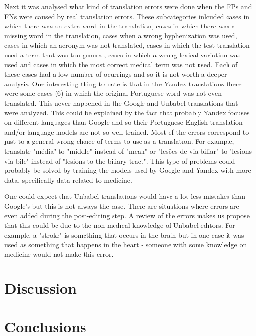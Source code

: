 Next it was analysed what kind of translation errors were done when the FPs and FNs were caused by real translation errors. These subcategories inlcuded cases in which there was an extra word in the translation, cases in which there was a missing word in the translation, cases when a wrong hyphenization was used, cases in which an acronym was not translated,  cases in which the test translation used a term that was too general, cases in which a wrong lexical variation was used  and cases in which the most correct medical term was not used. Each of these cases had a low number of ocurrings and so it is not worth a deeper analysis. One interesting thing to note is that in the Yandex translations there were some cases (6) in which the original Portuguese word was not even translated. This never happened in the Google and Unbabel translations that were analyzed. This could be explained by the fact that probably Yandex focuses on different languages than Google and so their Portuguese-English translation and/or language models are not so well trained. Most of the errors correspond to just to a general wrong  choice of terms to use as a translation. For example, translate "média" to "middle" instead of "mean" or "lesões de via biliar" to "lesions via bile" instead of "lesions to the biliary tract". This type of problems could probably be solved by training the models used by Google and Yandex with more data, specifically data related to medicine.

One could expect that Unbabel translations would have a lot less mistakes than Google's but this is not always the case. There are situations where errors are even added during the post-editing step. A review of the errors makes us propose that this could be due to the non-medical knowledge of Unbabel editors. For example, a "stroke" is something that occurs in the brain but in one case it was used as something that happens in the heart - someone with some knowledge on medicine would not make this error.


\section{Discussion}





\section{Conclusions}




  
